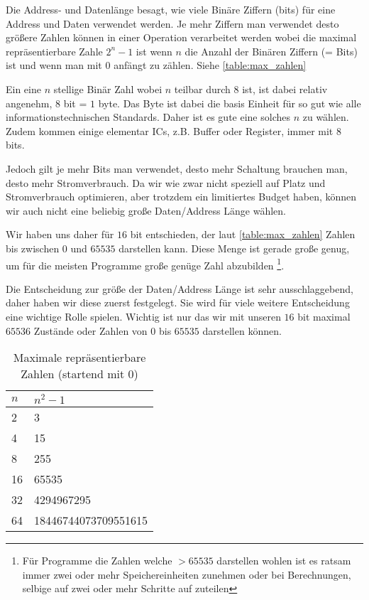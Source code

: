 \documentclass{scrartcl}
\begin{document}
Die Address- und Datenlänge besagt, wie viele Binäre Ziffern (bits) für eine Address und Daten verwendet werden.
Je mehr Ziffern man verwendet desto größere Zahlen können in einer Operation verarbeitet werden wobei die maximal repräsentierbare Zahle $2^n - 1$ ist wenn $n$ die Anzahl der Binären Ziffern (= Bits) ist und wenn man mit $0$ anfängt zu zählen.
Siehe \autoref{table:max_zahlen}

Ein eine $n$ stellige Binär Zahl wobei $n$ teilbar durch $8$ ist, ist dabei relativ angenehm, $8$ bit = $1$ byte.
Das Byte ist dabei die basis Einheit für so gut wie alle informationstechnischen Standards.
Daher ist es gute eine solches $n$ zu wählen.
Zudem kommen einige elementar ICs, z.B. Buffer oder Register, immer mit 8 bits.

Jedoch gilt je mehr Bits man verwendet, desto mehr Schaltung brauchen man, desto mehr Stromverbrauch.
Da wir wie zwar nicht speziell auf Platz und Stromverbrauch optimieren, aber trotzdem ein limitiertes Budget haben, können wir auch nicht eine beliebig große Daten/Address Länge wählen.

Wir haben uns daher für $16$ bit entschieden, der laut \autoref{table:max_zahlen} Zahlen bis zwischen $0$ und $65535$ darstellen kann.
Diese Menge ist gerade große genug, um für die meisten Programme große genüge Zahl abzubilden
\footnote{Für Programme die Zahlen welche $> 65535$ darstellen wohlen ist es ratsam immer zwei oder mehr Speichereinheiten zunehmen oder bei Berechnungen, selbige auf zwei oder mehr Schritte auf zuteilen}.

Die Entscheidung zur größe der Daten/Address Länge ist sehr ausschlaggebend, daher haben wir diese zuerst festgelegt.
Sie wird für viele weitere Entscheidung eine wichtige Rolle spielen.
Wichtig ist nur das wir mit unseren $16$ bit maximal $65536$ Zustände oder Zahlen von $0$ bis $65535$ darstellen können.

\begin{center}
	\begin{table}[h]
		\caption{\label{table:max_zahlen} Maximale repräsentierbare Zahlen (startend mit 0)}
		\begin{tabular}{ l | l }
 		$n$ & $n^2 - 1$ \\
		\hline 
		2 & 3\\  
		4 & 15\\
		8 & 255\\
		16 & 65535\\
 		32 & 4294967295\\
 		64 & 18446744073709551615\\
		\end{tabular}
	\end{table}
\end{center}
\end{document}
